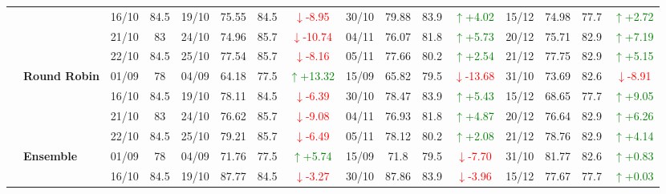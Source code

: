 {\begin{longtable}{llcc|cccc|cccc|cccc}
&
& 16/10 & 84.5 & 19/10 & 75.55 & 84.5 & \textcolor{red}{\(\downarrow\)-8.95} & 30/10 & 79.88 & 83.9 & \textcolor{green}{\(\uparrow\)+4.02} & 15/12 & 74.98 & 77.7 & \textcolor{green}{\(\uparrow\)+2.72} \\

&
& 21/10 & 83 & 24/10 & 74.96 & 85.7 & \textcolor{red}{\(\downarrow\)-10.74} & 04/11 & 76.07 & 81.8 & \textcolor{green}{\(\uparrow\)+5.73} & 20/12 & 75.71 & 82.9 & \textcolor{green}{\(\uparrow\)+7.19} \\

&
& 22/10 & 84.5 & 25/10 & 77.54 & 85.7 & \textcolor{red}{\(\downarrow\)-8.16} & 05/11 & 77.66 & 80.2 & \textcolor{green}{\(\uparrow\)+2.54} & 21/12 & 77.75 & 82.9 & \textcolor{green}{\(\uparrow\)+5.15} \\
\cmidrule(lr){2-16}


& \textbf{Round Robin}
& 01/09 & 78 & 04/09 & 64.18 & 77.5 & \textcolor{green}{\(\uparrow\)+13.32} & 15/09 & 65.82 & 79.5 & \textcolor{red}{\(\downarrow\)-13.68} & 31/10 & 73.69 & 82.6 & \textcolor{red}{\(\downarrow\)-8.91} \\

&
& 16/10 & 84.5 & 19/10 & 78.11 & 84.5 & \textcolor{red}{\(\downarrow\)-6.39} & 30/10 & 78.47 & 83.9 & \textcolor{green}{\(\uparrow\)+5.43} & 15/12 & 68.65 & 77.7 & \textcolor{green}{\(\uparrow\)+9.05} \\

&
& 21/10 & 83 & 24/10 & 76.62 & 85.7 & \textcolor{red}{\(\downarrow\)-9.08} & 04/11 & 76.93 & 81.8 & \textcolor{green}{\(\uparrow\)+4.87} & 20/12 & 76.64 & 82.9 & \textcolor{green}{\(\uparrow\)+6.26} \\

&
& 22/10 & 84.5 & 25/10 & 79.21 & 85.7 & \textcolor{red}{\(\downarrow\)-6.49} & 05/11 & 78.12 & 80.2 & \textcolor{green}{\(\uparrow\)+2.08} & 21/12 & 78.76 & 82.9 & \textcolor{green}{\(\uparrow\)+4.14} \\
\cmidrule(lr){2-16}




& \textbf{Ensemble}
& 01/09 & 78 & 04/09 & 71.76 & 77.5 & \textcolor{green}{\(\uparrow\)+5.74} & 15/09 & 71.8 & 79.5 & \textcolor{red}{\(\downarrow\)-7.70} & 31/10 & 81.77 & 82.6 & \textcolor{green}{\(\uparrow\)+0.83} \\

&
& 16/10 & 84.5 & 19/10 & 87.77 & 84.5 & \textcolor{red}{\(\downarrow\)-3.27} & 30/10 & 87.86 & 83.9 & \textcolor{red}{\(\downarrow\)-3.96} & 15/12 & 77.67 & 77.7 & \textcolor{green}{\(\uparrow\)+0.03} \\


\end{longtable}}
